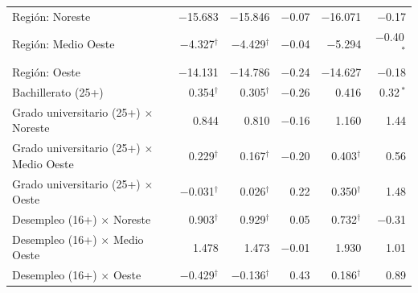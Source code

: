 {\begin{xltabular}{\linewidth}{>{\raggedright\arraybackslash}X r r r r r }
Región: Noreste & \num{-15.683} & \num{-15.846} & \num{-0.07} & \num{-16.071} & \num{-0.17} \\
Región: Medio Oeste & \num{-4.327}$^{\dagger}$ & \num{-4.429}$^{\dagger}$ & \num{-0.04} & \num{-5.294} & \num{-0.40}\,$^{\ast}$ \\
Región: Oeste & \num{-14.131} & \num{-14.786} & \num{-0.24} & \num{-14.627} & \num{-0.18} \\
Bachillerato (25+) & \num{0.354}$^{\dagger}$ & \num{0.305}$^{\dagger}$ & \num{-0.26} & \num{0.416} & \num{+0.32}\,$^{\ast}$ \\
Grado universitario (25+) $\times$ Noreste & \num{0.844} & \num{0.810} & \num{-0.16} & \num{1.160} & \num{+1.44} \\
Grado universitario (25+) $\times$ Medio Oeste & \num{0.229}$^{\dagger}$ & \num{0.167}$^{\dagger}$ & \num{-0.20} & \num{0.403}$^{\dagger}$ & \num{+0.56} \\
Grado universitario (25+) $\times$ Oeste & \num{-0.031}$^{\dagger}$ & \num{0.026}$^{\dagger}$ & \num{+0.22} & \num{0.350}$^{\dagger}$ & \num{+1.48} \\
Desempleo (16+) $\times$ Noreste & \num{0.903}$^{\dagger}$ & \num{0.929}$^{\dagger}$ & \num{+0.05} & \num{0.732}$^{\dagger}$ & \num{-0.31} \\
Desempleo (16+) $\times$ Medio Oeste & \num{1.478} & \num{1.473} & \num{-0.01} & \num{1.930} & \num{+1.01} \\
Desempleo (16+) $\times$ Oeste & \num{-0.429}$^{\dagger}$ & \num{-0.136}$^{\dagger}$ & \num{+0.43} & \num{0.186}$^{\dagger}$ & \num{+0.89} \\
\end{xltabular}
}
